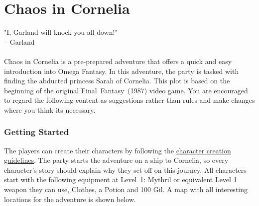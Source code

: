 \section*{\hypertarget{coc}{Chaos in Cornelia}}
%
"I, Garland will knock you all down!" \\ 
\indent -- Garland \\\\ 
Chaos in Cornelia is a pre-prepared adventure that offers a quick and easy introduction into Omega Fantasy.
In this adventure, the party is tasked with finding the abducted princess Sarah of Cornelia.
This plot is based on the beginning of the original Final~Fantasy~(1987) video game.
You are encouraged to regard the following content as suggestions rather than rules and make changes where you think its necessary. 

\subsubsection*{Getting Started}
The players can create their characters by following the \hyperlink{char}{character creation guidelines}.
The party starts the adventure on a ship to Cornelia, so every character's story should explain why they set off on this journey.  
All characters start with the following equipment at Level~1: Mythril or equivalent Level 1 weapon they can use, Clothes, a Potion and 100 Gil. 
A map with all interesting locations for the adventure is shown below.

\vfill

